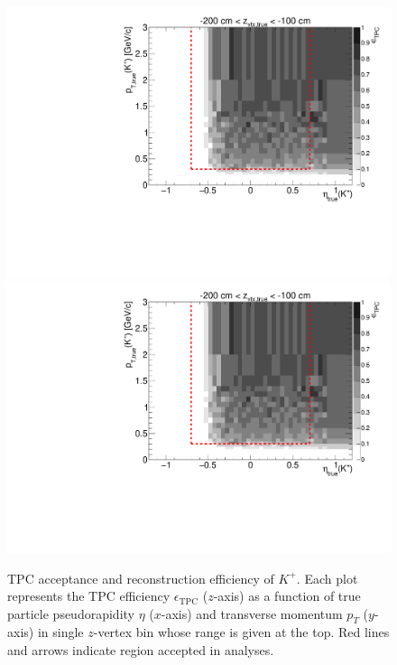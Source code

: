 \begin{figure}[hb]
\caption[TPC acceptance and reconstruction efficiency of $K^{+}$.]{TPC acceptance and reconstruction efficiency of $K^{+}$. Each plot represents the TPC efficiency $\epsilon_{\text{TPC}}$ ($z$-axis) as a function of true particle pseudorapidity $\eta$ ($x$-axis) and transverse momentum $p_{T}$ ($y$-axis) in single $z$-vertex bin whose range is given at the top. Red lines and arrows indicate region accepted in analyses.}\label{fig:eff_kaon_plus}
\centering
\parbox{0.495\textwidth}{
  \centering
  \includegraphics[width=\linewidth,page=3]{graphics/eff/Eff2D_TPC_kaon_Plus.pdf}\\
  \includegraphics[width=\linewidth,page=5]{graphics/eff/Eff2D_TPC_kaon_Plus.pdf}\\
}
\end{figure}
